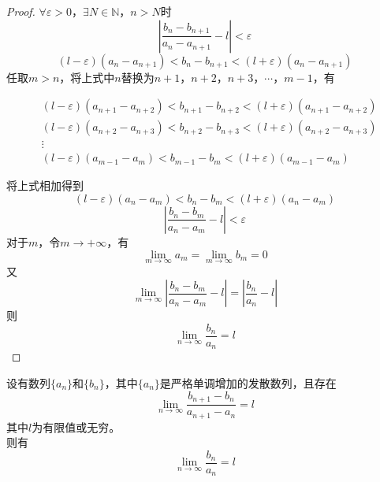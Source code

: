 \begin{proof}
    
    $\forall \varepsilon>0$，$\exists N \in \mathbb{N}$，$n > N$时
    $$\left| \dfrac{b_n-b_{n+1}}{a_n-a_{n+1}}-l\right| < \varepsilon$$
    $$(l-\varepsilon)(a_n-a_{n+1})<b_n-b_{n+1}<(l+\varepsilon)(a_n-a_{n+1})$$
    任取$m>n$，将上式中$n$替换为$n+1$，$n+2$，$n+3$，$\cdots$，$m-1$，有

    \begin{align*}
        &(l-\varepsilon)(a_{n+1}-a_{n+2})<b_{n+1}-b_{n+2}<(l+\varepsilon)(a_{n+1}-a_{n+2})\\
        &(l-\varepsilon)(a_{n+2}-a_{n+3})<b_{n+2}-b_{n+3}<(l+\varepsilon)(a_{n+2}-a_{n+3})\\
        &\vdots\\
        &(l-\varepsilon)(a_{m-1}-a_{m})<b_{m-1}-b_{m}<(l+\varepsilon)(a_{m-1}-a_{m})
    \end{align*}

    将上式相加得到
    $$(l-\varepsilon)(a_{n}-a_{m})<b_{n}-b_{m}<(l+\varepsilon)(a_{n}-a_{m})$$
    $$\left| \dfrac{b_n-b_{m}}{a_n-a_{m}}-l\right| < \varepsilon$$
    对于$m$，令$m\to+\infty$，有
    $$\lim_{m\to\infty}{a_m}=\lim_{m\to\infty}{b_m}=0$$
    又
    $$\lim_{m\to\infty}{\left| \dfrac{b_n-b_{m}}{a_n-a_{m}}-l\right|} = \left|\dfrac{b_n}{a_n}-l\right|$$
    则
    $$\lim_{n\to\infty}{\dfrac{b_n}{a_n}} = l$$

\end{proof}

\begin{proposition}
    
    设有数列$\{a_n\}$和$\{b_n\}$，其中$\{a_n\}$是严格单调增加的发散数列，且存在
    $$\lim_{n\to\infty}{\dfrac{b_{n+1}- b_n}{a_{n+1}-a_n}} = l $$
    其中$l$为有限值或无穷。\\
    则有
    $$\lim_{n\to\infty}{\dfrac{b_n}{a_n}} = l$$

\end{proposition}

